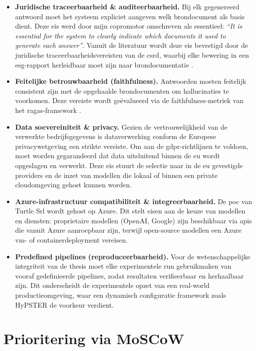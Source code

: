 \begin{itemize}
  \item \textbf{Juridische traceerbaarheid \& auditeerbaarheid.} Bij elk gegenereerd antwoord moet het systeem expliciet aangeven welk brondocument als basis dient. Deze eis werd door mijn copromotor omschreven als essentieel: \textit{``It is essential for the system to clearly indicate which documents it used to generate each answer''}. Vanuit de literatuur wordt deze eis bevestigd door de juridische traceerbaarheidsvereisten van de \gls{csrd}, waarbij elke bewering in een \gls{esg}-rapport herleidbaar moet zijn naar brondocumentatie \autocite{Centre.2023}.
  \item \textbf{Feitelijke betrouwbaarheid (faithfulness).} Antwoorden moeten feitelijk consistent zijn met de opgehaalde brondocumenten om hallucinaties te voorkomen. Deze vereiste wordt geëvalueerd via de faithfulness-metriek van het \gls{ragas}-framework \autocite{Es2024}.
  \item \textbf{Data soevereiniteit \& privacy.} Gezien de vertrouwelijkheid van de verwerkte bedrijfsgegevens is dataverwerking conform de Europese privacywetgeving een strikte vereiste. Om aan de \gls{gdpr}-richtlijnen te voldoen, moet worden gegarandeerd dat data uitsluitend binnen de \gls{eu} wordt opgeslagen en verwerkt. Deze eis stuurt de selectie naar in de \gls{eu} gevestigde providers en de inzet van modellen die lokaal of binnen een private cloudomgeving gehost kunnen worden.
  \item \textbf{Azure-infrastructuur compatibiliteit \& integreerbaarheid.} De \gls{poc} van Turtle Srl wordt gehost op Azure. Dit stelt eisen aan de keuze van modellen en diensten: proprietaire modellen (OpenAI, Google) zijn beschikbaar via \glspl{api} die vanuit Azure aanroepbaar zijn, terwijl open-source modellen een Azure \gls{vm}- of containerdeployment vereisen.
  \item \textbf{Predefined pipelines (reproduceerbaarheid).} Voor de wetenschappelijke integriteit van de thesis moet elke experimentele run gebruikmaken van vooraf gedefinieerde pipelines, zodat resultaten verifieerbaar en herhaalbaar zijn. Dit onderscheidt de experimentele opzet van een real-world productieomgeving, waar een dynamisch configuratie framework zoals HyPSTER de voorkeur verdient.
\end{itemize}

\section{Prioritering via MoSCoW}

